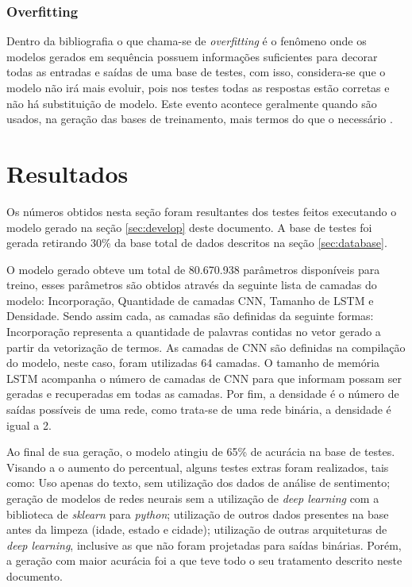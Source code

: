 \documentclass[12pt]{article}
\begin{document}
\subsubsection{Overfitting}\label{sec:overfitting}

Dentro da bibliografia o que chama-se de \emph{overfitting} é o fenômeno onde os modelos gerados em sequência possuem informações suficientes para decorar todas as entradas e saídas de uma base de testes, com isso, considera-se que o modelo não irá mais evoluir, pois nos testes todas as respostas estão corretas e não há substituição de modelo. Este evento acontece geralmente quando são usados, na geração das bases de treinamento, mais termos do que o necessário \cite{hawkins:04}.

\section{Resultados}\label{sec:result}

Os números obtidos nesta seção foram resultantes dos testes feitos executando o modelo gerado na seção \ref{sec:develop} deste documento. A base de testes foi gerada retirando 30\% da base total de dados descritos na seção \ref{sec:database}. 

O modelo gerado obteve um total de 80.670.938 parâmetros disponíveis para treino, esses parâmetros são obtidos através da seguinte lista de camadas do modelo: Incorporação, Quantidade de camadas CNN, Tamanho de LSTM e Densidade. Sendo assim cada, as camadas são definidas da seguinte formas: Incorporação representa a quantidade de palavras contidas no vetor gerado a partir da vetorização de termos. As camadas de CNN são definidas na compilação do modelo, neste caso, foram utilizadas 64 camadas. O tamanho de memória LSTM acompanha o número de camadas de CNN para que informam possam ser geradas e recuperadas em todas as camadas. Por fim, a densidade é o número de saídas possíveis de uma rede, como trata-se de uma rede binária, a densidade é igual a 2. 

Ao final de sua geração, o modelo atingiu de 65\% de acurácia na base de testes. Visando a o aumento do percentual, alguns testes extras foram realizados, tais como: Uso apenas do texto, sem utilização dos dados de análise de sentimento; geração de modelos de redes neurais sem a utilização de \emph{deep learning} com a biblioteca de \emph{sklearn} para \emph{python}; utilização de outros dados presentes na base antes da limpeza (idade, estado e cidade); utilização de outras arquiteturas de \emph{deep learning}, inclusive as que não foram projetadas para saídas binárias. Porém, a geração com maior acurácia foi a que teve todo o seu tratamento descrito neste documento.
\end{document}

